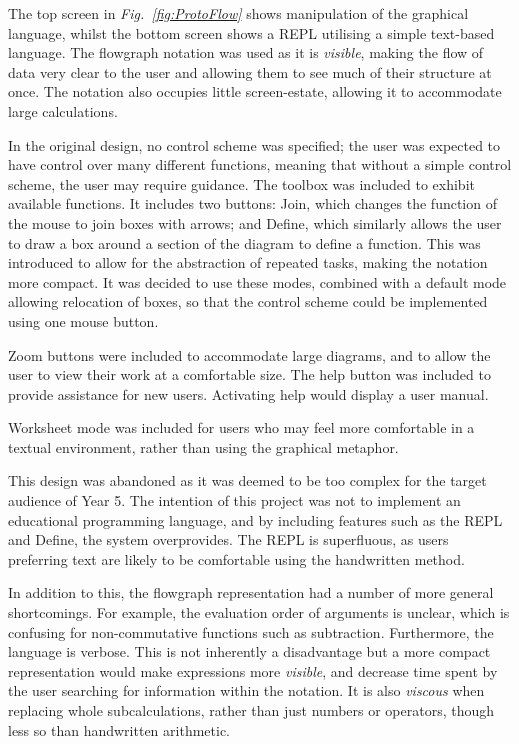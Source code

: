 \documentclass[12pt,twoside,notitlepage,xetex]{report}
\begin{document}
The top screen in \emph{Fig.~\ref{fig:ProtoFlow}} shows manipulation of the graphical language, whilst the bottom screen shows a REPL utilising a simple text-based language.  The flowgraph notation was used as it is \emph{visible}, making the flow of data very clear to the user and allowing them to see much of their structure at once.  The notation also occupies little screen-estate, allowing it to accommodate large calculations.

In the original design, no control scheme was specified; the user was expected to have control over many different functions, meaning that without a simple control scheme, the user may require guidance.  The toolbox was included to exhibit available functions.  It includes two buttons: {\sfapp Join}, which changes the function of the mouse to join boxes with arrows; and {\sfapp Define}, which similarly allows the user to draw a box around a section of the diagram to define a function.  This was introduced to allow for the abstraction of repeated tasks, making the notation more compact.  It was decided to use these modes, combined with a default mode allowing relocation of boxes, so that the control scheme could be implemented using one mouse button.

Zoom buttons were included to accommodate large diagrams, and to allow the user to view their work at a comfortable size.  The help button was included to provide assistance for new users.  Activating help would display a user manual.

{\sfapp Worksheet} mode was included for users who may feel more comfortable in a textual environment, rather than using the graphical metaphor.

This design was abandoned as it was deemed to be too complex for the target audience of Year 5.  The intention of this project was not to implement an educational programming language, and by including features such as the REPL and {\sfapp Define}, the system overprovides.  The REPL is superfluous, as users preferring text are likely to be comfortable using the handwritten method.

In addition to this, the flowgraph representation had a number of more general shortcomings. For example, the evaluation order of arguments is unclear, which is confusing for non-commutative functions such as subtraction.  Furthermore, the language is verbose.  This is not inherently a disadvantage but a more compact representation would make expressions more \emph{visible}, and decrease time spent by the user searching for information within the notation.  It is also \emph{viscous} when replacing whole subcalculations, rather than just numbers or operators, though less so than handwritten arithmetic.
\end{document}
